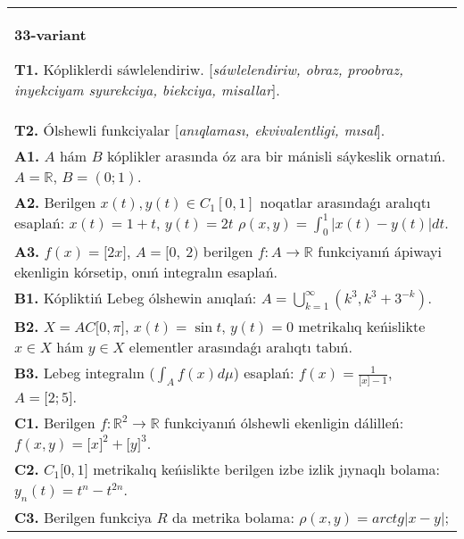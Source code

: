 \documentclass{article}
\begin{document}
\begin{tabular}{m{17cm}}
\textbf{33-variant}
\newline

\textbf{T1.} Kópliklerdi sáwlelendiriw. [\textit{sáwlelendiriw, obraz, proobraz, inyekciyam syurekciya, biekciya, misallar}]. \\
\textbf{T2.} Ólshewli funkciyalar [\textit{anıqlaması, ekvivalentligi, mısal}]. \\
\textbf{A1.} \(A\) hám \(B\) kóplikler arasında óz ara bir mánisli sáykeslik ornatıń. \(A\mathbb{= R}\), \(B = (0;1)\). \\
\textbf{A2.} Berilgen \(x(t),y(t)\in C_1[0,1]\) noqatlar arasındaǵı aralıqtı esaplań: \(x(t) = 1 + t\), \(y(t) = 2t\) \(\rho(x,y) = \int_{0}^{1}{\left| x(t) - y(t) \right|dt}\). \\
\textbf{A3.} \(f(x) = \lbrack 2x\rbrack\), \(A = \lbrack 0,\ 2)\) berilgen \(f:A\rightarrow\mathbb{R}\) funkciyanıń ápiwayi ekenligin kórsetip, onıń integralın esaplań. \\
\textbf{B1.} Kópliktiń Lebeg ólshewin anıqlań: \(A = \bigcup_{k = 1}^{\infty}\left( k^{3},k^{3} + 3^{- k} \right)\). \\
\textbf{B2.} \(X = AC\lbrack 0,\pi\rbrack\), \(x(t) = \sin t\), \(y(t) = 0\) metrikalıq keńislikte \(x \in X\) hám \(y \in X\) elementler arasındaǵı aralıqtı tabıń. \\
\textbf{B3.} Lebeg integralın (\(\int_{A}^{}{f(x)d\mu}\)) esaplań: \(f(x) = \frac{1}{\lbrack x\rbrack - 1}\), \(A = \lbrack 2;5\rbrack\). \\
\textbf{C1.} Berilgen \(f:\mathbb{R}^{2}\mathbb{\rightarrow R}\) funkciyanıń ólshewli ekenligin dálilleń: \(f(x,y) = \lbrack x\rbrack^{2} + \lbrack y\rbrack^{3}\). \\
\textbf{C2.} \(C_{1}\lbrack 0,1\rbrack\) metrikalıq keńislikte berilgen izbe izlik jıynaqlı bolama: \(y_{n}(t) = t^{n} - t^{2n}\). \\
\textbf{C3.} Berilgen funkciya \(R\) da metrika bolama: \(\rho(x,y) = arctg|x - y|\); \\

\end{tabular}
\vspace{1cm}
\end{document}
